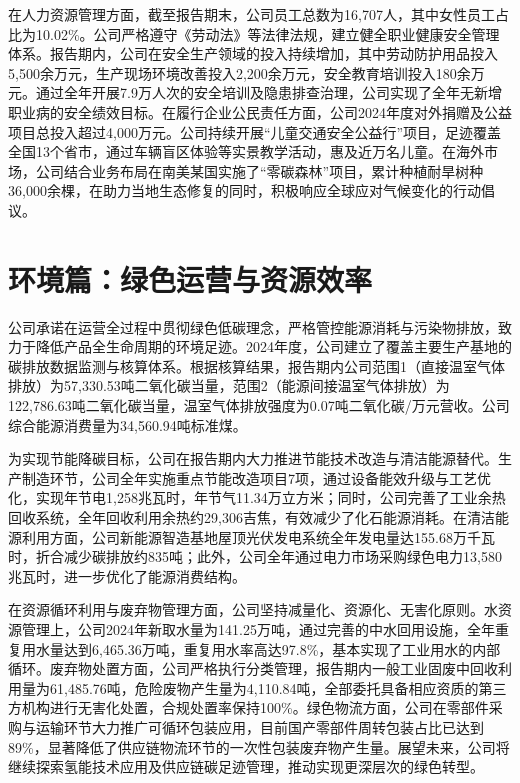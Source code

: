 \documentclass[a4paper,12pt]{article}
\begin{document}
在人力资源管理方面，截至报告期末，公司员工总数为16,707人，其中女性员工占比为10.02\%。公司严格遵守《劳动法》等法律法规，建立健全职业健康安全管理体系。报告期内，公司在安全生产领域的投入持续增加，其中劳动防护用品投入5,500余万元，生产现场环境改善投入2,200余万元，安全教育培训投入180余万元。通过全年开展7.9万人次的安全培训及隐患排查治理，公司实现了全年无新增职业病的安全绩效目标。在履行企业公民责任方面，公司2024年度对外捐赠及公益项目总投入超过4,000万元。公司持续开展“儿童交通安全公益行”项目，足迹覆盖全国13个省市，通过车辆盲区体验等实景教学活动，惠及近万名儿童。在海外市场，公司结合业务布局在南美某国实施了“零碳森林”项目，累计种植耐旱树种36,000余棵，在助力当地生态修复的同时，积极响应全球应对气候变化的行动倡议。

\section{环境篇：绿色运营与资源效率}

公司承诺在运营全过程中贯彻绿色低碳理念，严格管控能源消耗与污染物排放，致力于降低产品全生命周期的环境足迹。2024年度，公司建立了覆盖主要生产基地的碳排放数据监测与核算体系。根据核算结果，报告期内公司范围1（直接温室气体排放）为57,330.53吨二氧化碳当量，范围2（能源间接温室气体排放）为122,786.63吨二氧化碳当量，温室气体排放强度为0.07吨二氧化碳/万元营收。公司综合能源消费量为34,560.94吨标准煤。

为实现节能降碳目标，公司在报告期内大力推进节能技术改造与清洁能源替代。生产制造环节，公司全年实施重点节能改造项目7项，通过设备能效升级与工艺优化，实现年节电1,258兆瓦时，年节气11.34万立方米；同时，公司完善了工业余热回收系统，全年回收利用余热约29,306吉焦，有效减少了化石能源消耗。在清洁能源利用方面，公司新能源智造基地屋顶光伏发电系统全年发电量达155.68万千瓦时，折合减少碳排放约835吨；此外，公司全年通过电力市场采购绿色电力13,580兆瓦时，进一步优化了能源消费结构。

在资源循环利用与废弃物管理方面，公司坚持减量化、资源化、无害化原则。水资源管理上，公司2024年新取水量为141.25万吨，通过完善的中水回用设施，全年重复用水量达到6,465.36万吨，重复用水率高达97.8\%，基本实现了工业用水的内部循环。废弃物处置方面，公司严格执行分类管理，报告期内一般工业固废中回收利用量为61,485.76吨，危险废物产生量为4,110.84吨，全部委托具备相应资质的第三方机构进行无害化处置，合规处置率保持100\%。绿色物流方面，公司在零部件采购与运输环节大力推广可循环包装应用，目前国产零部件周转包装占比已达到89\%，显著降低了供应链物流环节的一次性包装废弃物产生量。展望未来，公司将继续探索氢能技术应用及供应链碳足迹管理，推动实现更深层次的绿色转型。

\vspace{3cm}
\end{document}
